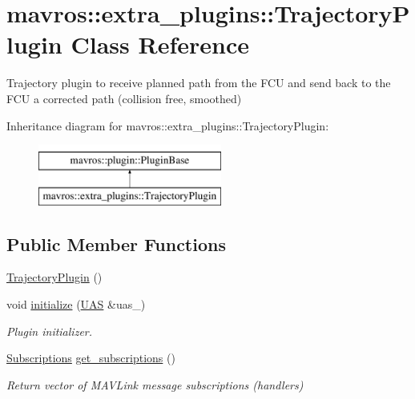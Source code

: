 \hypertarget{classmavros_1_1extra__plugins_1_1TrajectoryPlugin}{}\section{mavros\+::extra\+\_\+plugins\+::Trajectory\+Plugin Class Reference}
\label{classmavros_1_1extra__plugins_1_1TrajectoryPlugin}


Trajectory plugin to receive planned path from the F\+CU and send back to the F\+CU a corrected path (collision free, smoothed)  


Inheritance diagram for mavros\+::extra\+\_\+plugins\+::Trajectory\+Plugin\+:\begin{figure}[H]
\begin{center}
\leavevmode
\includegraphics[height=2.000000cm]{classmavros_1_1extra__plugins_1_1TrajectoryPlugin}
\end{center}
\end{figure}
\subsection*{Public Member Functions}
\begin{DoxyCompactItemize}
\item 
\mbox{\hyperlink{group__plugin_ga97ea75d091e826ffb7445dd2f4863880}{Trajectory\+Plugin}} ()
\item 
void \mbox{\hyperlink{group__plugin_ga2a6372c5c89e9910eb979bc01a257609}{initialize}} (\mbox{\hyperlink{classmavros_1_1UAS}{U\+AS}} \&uas\+\_\+)
\begin{DoxyCompactList}\small\item\em Plugin initializer. \end{DoxyCompactList}\item 
\mbox{\hyperlink{group__plugin_ga8967d61fc77040e0c3ea5a4585d62a09}{Subscriptions}} \mbox{\hyperlink{group__plugin_gaae780d771bd0792a591dc341783cf8de}{get\+\_\+subscriptions}} ()
\begin{DoxyCompactList}\small\item\em Return vector of M\+A\+V\+Link message subscriptions (handlers) \end{DoxyCompactList}\end{DoxyCompactItemize}
